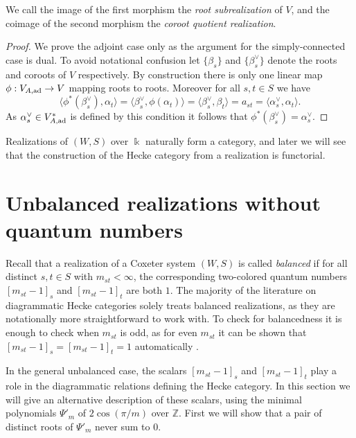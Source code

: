 \documentclass{amsart}
\theoremstyle{plain}
\theoremstyle{definition}
\theoremstyle{remark}
\numberwithin{equation}{section}
\newcommand{\defnemph}[1]{\emph{#1}}
\newcommand{\ZZ}{\mathbb{Z}}
\begin{document}
We call the image of the first morphism the \defnemph{root subrealization} of $V$, and the coimage of the second morphism the \defnemph{coroot quotient realization}.

\begin{proof}
We prove the adjoint case only as the argument for the simply-connected case is dual.
To avoid notational confusion let $\{\beta_s\}$ and $\{\beta_s^\vee\}$ denote the roots and coroots of $V$ respectively.
By construction there is only one linear map $\phi: V_{A,{\rm ad}} \rightarrow V$ mapping roots to roots. 
Moreover for all $s,t \in S$ we have
\begin{equation*}
\langle \phi^\ast(\beta_s^\vee),\alpha_t \rangle=\langle \beta_s^\vee,\phi(\alpha_t)\rangle=\langle \beta_s^\vee,\beta_t\rangle=a_{st}=\langle \alpha_s^\vee, \alpha_t \rangle \text{.}
\end{equation*}
As $\alpha_s^\vee \in V_{A,{\rm ad}}^\ast$ is defined by this condition it follows that $\phi^\ast(\beta_s^\vee)=\alpha_s^\vee$.
\end{proof}


Realizations of $(W,S)$ over $\Bbbk$ naturally form a category, and later we will see that the construction of the Hecke category from a realization is functorial. 

\section{Unbalanced realizations without quantum numbers}

Recall that a realization of a Coxeter system $(W,S)$ is called \defnemph{balanced} if for all distinct $s,t \in S$ with $m_{st}<\infty$, the corresponding two-colored quantum numbers $[m_{st}-1]_s$ and $[m_{st}-1]_t$ are both $1$. 
The majority of the literature on diagrammatic Hecke categories solely treats balanced realizations, as they are notationally more straightforward to work with. 
To check for balancedness it is enough to check when $m_{st}$ is odd, as for even $m_{st}$ it can be shown that $[m_{st}-1]_s=[m_{st}-1]_t=1$ automatically \cite[Lemma~6.25]{ew-loccalc}.

In the general unbalanced case, the scalars $[m_{st}-1]_s$ and $[m_{st}-1]_t$ play a role in the diagrammatic relations defining the Hecke category. 
In this section we will give an alternative description of these scalars, using the minimal polynomials $\Psi'_m$ of $2\cos(\pi/m)$ over $\ZZ$. 
First we will show that a pair of distinct roots of $\Psi'_m$ never sum to $0$.
\end{document}
